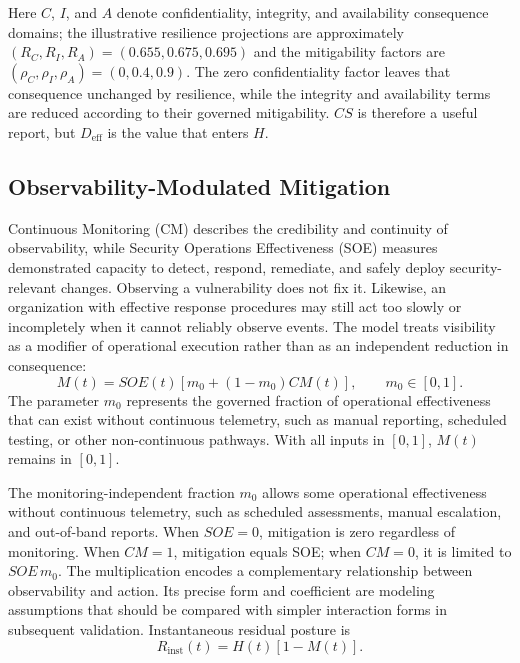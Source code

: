 \documentclass[11pt]{article}
\begin{document}
Here $C$, $I$, and $A$ denote confidentiality, integrity, and availability consequence
domains; the illustrative resilience projections are approximately
$(R_C,R_I,R_A)=(0.655,0.675,0.695)$ and the mitigability factors are
$(\rho_C,\rho_I,\rho_A)=(0,0.4,0.9)$. The zero confidentiality factor leaves that
consequence unchanged by resilience, while the integrity and availability terms are
reduced according to their governed mitigability. $CS$ is therefore a useful report,
but $D_{\mathrm{eff}}$ is the value that enters $H$.

\subsection{Observability-Modulated Mitigation}
Continuous Monitoring (CM) describes the credibility and continuity of
observability, while Security Operations Effectiveness (SOE) measures
demonstrated capacity to detect, respond, remediate, and safely deploy
security-relevant changes. Observing a vulnerability does not fix it.
Likewise, an organization with effective response procedures may still
act too slowly or incompletely when it cannot reliably observe events.
The model treats visibility as a modifier of operational execution rather
than as an independent reduction in consequence:
\begin{equation}
  M(t)=SOE(t)\left[m_0+(1-m_0)CM(t)\right],
  \qquad m_0\in[0,1].
  \label{eq:mitigation}
\end{equation}
The parameter $m_0$ represents the governed fraction of operational effectiveness that
can exist without continuous telemetry, such as manual reporting, scheduled testing,
or other non-continuous pathways. With all inputs in $[0,1]$, $M(t)$ remains in
$[0,1]$.

The monitoring-independent fraction $m_0$ allows some operational
effectiveness without continuous telemetry, such as scheduled
assessments, manual escalation, and out-of-band reports. When
$SOE=0$, mitigation is zero regardless of monitoring. When $CM=1$,
mitigation equals SOE; when $CM=0$, it is limited to $SOE\,m_0$.
The multiplication encodes a complementary relationship between
observability and action. Its precise form and coefficient are
modeling assumptions that should be compared with simpler interaction
forms in subsequent validation.
Instantaneous residual posture is
\begin{equation}
  R_{\mathrm{inst}}(t)=H(t)\left[1-M(t)\right].
  \label{eq:rinst}
\end{equation}
\end{document}
